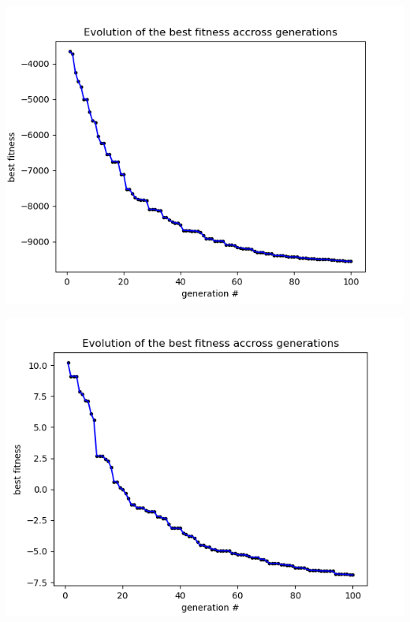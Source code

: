 \documentclass[12pt]{article}
\begin{document}
				\begin{minipage}{0.6\linewidth}
					\includegraphics[width=\linewidth]{11.png}
				\end{minipage}
				\hfill
				\begin{minipage}{0.6\linewidth}
					\includegraphics[width=\linewidth]{12.png}
				\end{minipage}
\end{document}
